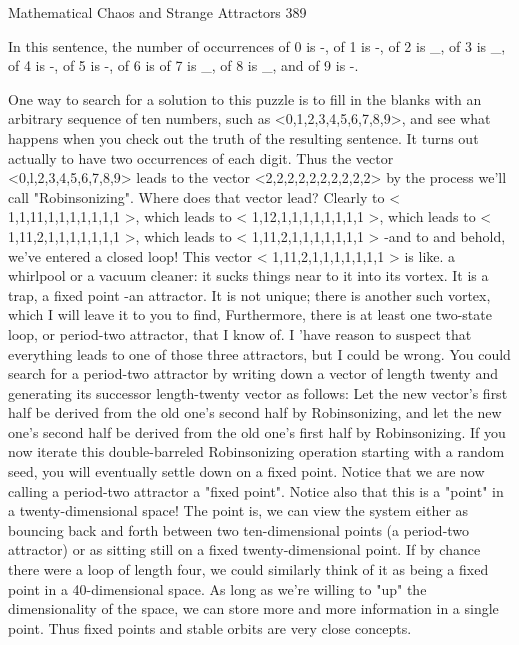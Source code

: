 Mathematical Chaos and Strange Attractors                                              389

   In this sentence, the number of occurrences of 0 is -, of 1 is -, of 2 is \_, of 3 is \_,
   of 4 is -, of 5 is -, of 6 is of 7 is \_, of 8 is \_, and of 9 is -.

One way to search for a solution to this puzzle is to fill in the blanks with an arbitrary
sequence of ten numbers, such as <0,1,2,3,4,5,6,7,8,9>, and see what happens when
you check out the truth of the resulting sentence. It turns out actually to have two
occurrences of each digit. Thus the vector <0,l,2,3,4,5,6,7,8,9> leads to the vector
<2,2,2,2,2,2,2,2,2,2> by the process we'll call "Robinsonizing". Where does that
vector lead? Clearly to < 1,1,11,1,1,1,1,1,1,1 >, which leads to < 1,12,1,1,1,1,1,1,1,1
>, which leads to < 1,11,2,1,1,1,1,1,1,1 >, which leads to < 1,11,2,1,1,1,1,1,1,1 > -and
to and behold, we've entered a closed loop!
        This vector < 1,11,2,1,1,1,1,1,1,1 > is like. a whirlpool or a vacuum cleaner: it
sucks things near to it into its vortex. It is a trap, a fixed point -an attractor. It is not
unique; there is another such vortex, which I will leave it to you to find, Furthermore,
there is at least one two-state loop, or period-two attractor, that I know of. I 'have
reason to suspect that everything leads to one of those three attractors, but I could be
wrong. You could search for a period-two attractor by writing down a vector of length
twenty and generating its successor length-twenty vector as follows: Let the new
vector's first half be derived from the old one's second half by Robinsonizing, and let
the new one's second half be derived from the old one's first half by Robinsonizing. If
you now iterate this double-barreled Robinsonizing operation starting with a random
seed, you will eventually settle down on a fixed point.
        Notice that we are now calling a period-two attractor a "fixed point". Notice
also that this is a "point" in a twenty-dimensional space! The point is, we can view the
system either as bouncing back and forth between two ten-dimensional points (a
period-two attractor) or as sitting still on a fixed twenty-dimensional point. If by
chance there were a loop of length four, we could similarly think of it as being a fixed
point in a 40-dimensional space. As long as we're willing to "up" the dimensionality
of the space, we can store more and more information in a single point. Thus fixed
points and stable orbits are very close concepts.

